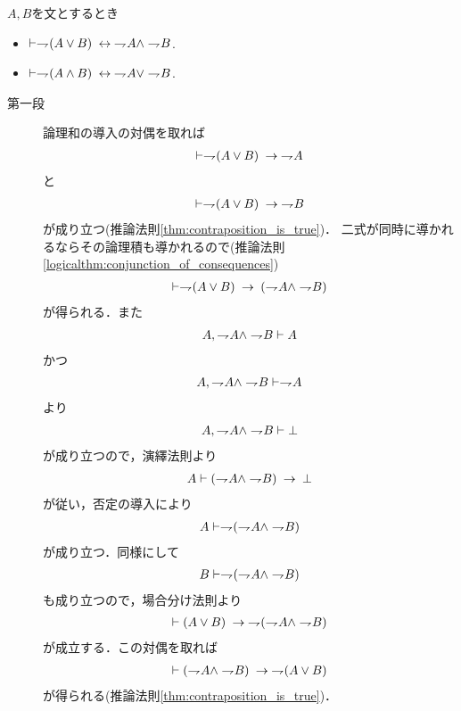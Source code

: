 	\begin{screen}
		\begin{logicalthm}[De Morganの法則]
			$A,B$を文とするとき
			\begin{itemize}
				\item $\vdash \negation (A \vee B) \lrarrow \negation A \wedge \negation B$.
			
				\item $\vdash \negation (A \wedge B) \lrarrow \negation A \vee \negation B$.
			\end{itemize}
		\end{logicalthm}
	\end{screen}
	
	\begin{prf}\mbox{}
		\begin{description}
			\item[第一段]	論理和の導入の対偶を取れば
				\begin{align}
					\vdash \negation (A \vee B) \rarrow \negation A
				\end{align}
				と
				\begin{align}
					\vdash \negation (A \vee B) \rarrow \negation B
				\end{align}
				が成り立つ(推論法則\ref{thm:contraposition_is_true})．
				二式が同時に導かれるならその論理積も導かれるので(推論法則\ref{logicalthm:conjunction_of_consequences})
				\begin{align}
					\vdash \negation (A \vee B) \rarrow (\negation A \wedge \negation B)
				\end{align}
				が得られる．また
				\begin{align}
					A, \negation A \wedge \negation B \vdash A
				\end{align}
				かつ
				\begin{align}
					A, \negation A \wedge \negation B \vdash \negation A
				\end{align}
				より
				\begin{align}
					A, \negation A \wedge \negation B \vdash \bot
				\end{align}
				が成り立つので，演繹法則より
				\begin{align}
					A \vdash (\negation A \wedge \negation B) \rarrow \bot
				\end{align}
				が従い，否定の導入により
				\begin{align}
					A \vdash \negation (\negation A \wedge \negation B)
				\end{align}
				が成り立つ．同様にして
				\begin{align}
					B \vdash \negation (\negation A \wedge \negation B)
				\end{align}
				も成り立つので，場合分け法則より
				\begin{align}
					\vdash (A \vee B) \rarrow \negation (\negation A \wedge \negation B)
				\end{align}
				が成立する．この対偶を取れば
				\begin{align}
					\vdash (\negation A \wedge \negation B) \rarrow \negation (A \vee B)
				\end{align}
				が得られる(推論法則\ref{thm:contraposition_is_true})．
				

\end{description}
\end{prf}
